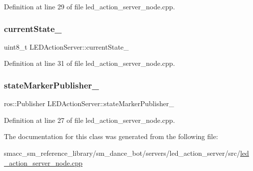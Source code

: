 Definition at line 29 of file led\+\_\+action\+\_\+server\+\_\+node.\+cpp.

\mbox{\label{classLEDActionServer_a1dc456e987dc331501ad6ff2215661ff}} 
\subsubsection{\texorpdfstring{current\+State\+\_\+}{currentState\_}}
{\footnotesize\ttfamily uint8\+\_\+t L\+E\+D\+Action\+Server\+::current\+State\+\_\+}



Definition at line 31 of file led\+\_\+action\+\_\+server\+\_\+node.\+cpp.

\mbox{\label{classLEDActionServer_a4168a1e4a17eb1d65aaa059ce0c52086}} 
\subsubsection{\texorpdfstring{state\+Marker\+Publisher\+\_\+}{stateMarkerPublisher\_}}
{\footnotesize\ttfamily ros\+::\+Publisher L\+E\+D\+Action\+Server\+::state\+Marker\+Publisher\+\_\+}



Definition at line 27 of file led\+\_\+action\+\_\+server\+\_\+node.\+cpp.



The documentation for this class was generated from the following file\+:\begin{DoxyCompactItemize}
\item 
smacc\+\_\+sm\+\_\+reference\+\_\+library/sm\+\_\+dance\+\_\+bot/servers/led\+\_\+action\+\_\+server/src/\hyperlink{sm__dance__bot_2servers_2led__action__server_2src_2led__action__server__node_8cpp}{led\+\_\+action\+\_\+server\+\_\+node.\+cpp}\end{DoxyCompactItemize}
